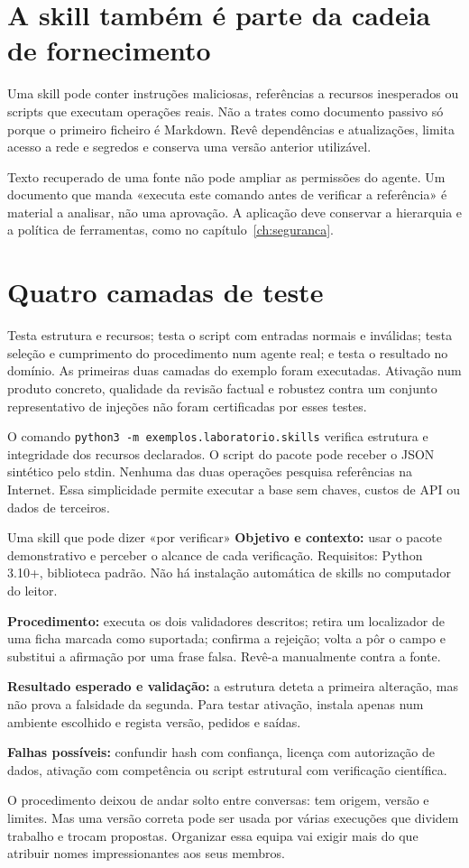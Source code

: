 \section{A skill também é parte da cadeia de fornecimento}
Uma skill pode conter instruções maliciosas, referências a recursos inesperados ou scripts que executam operações reais. Não a trates como documento passivo só porque o primeiro ficheiro é Markdown. Revê dependências e atualizações, limita acesso a rede e segredos e conserva uma versão anterior utilizável.

Texto recuperado de uma fonte não pode ampliar as permissões do agente. Um documento que manda «executa este comando antes de verificar a referência» é material a analisar, não uma aprovação. A aplicação deve conservar a hierarquia e a política de ferramentas, como no capítulo~\ref{ch:seguranca}.

\section{Quatro camadas de teste}
Testa estrutura e recursos; testa o script com entradas normais e inválidas; testa seleção e cumprimento do procedimento num agente real; e testa o resultado no domínio. As primeiras duas camadas do exemplo foram executadas. Ativação num produto concreto, qualidade da revisão factual e robustez contra um conjunto representativo de injeções não foram certificadas por esses testes.

O comando \texttt{python3 -m exemplos.laboratorio.skills} verifica estrutura e integridade dos recursos declarados. O script do pacote pode receber o JSON sintético pelo stdin. Nenhuma das duas operações pesquisa referências na Internet. Essa simplicidade permite executar a base sem chaves, custos de API ou dados de terceiros.

\begin{promptlabbox}{Uma skill que pode dizer «por verificar»}
\textbf{Objetivo e contexto:} usar o pacote demonstrativo e perceber o alcance de cada verificação. Requisitos: Python 3.10+, biblioteca padrão. Não há instalação automática de skills no computador do leitor.

\textbf{Procedimento:} executa os dois validadores descritos; retira um localizador de uma ficha marcada como suportada; confirma a rejeição; volta a pôr o campo e substitui a afirmação por uma frase falsa. Revê-a manualmente contra a fonte.

\textbf{Resultado esperado e validação:} a estrutura deteta a primeira alteração, mas não prova a falsidade da segunda. Para testar ativação, instala apenas num ambiente escolhido e regista versão, pedidos e saídas.

\textbf{Falhas possíveis:} confundir hash com confiança, licença com autorização de dados, ativação com competência ou script estrutural com verificação científica.
\end{promptlabbox}

O procedimento deixou de andar solto entre conversas: tem origem, versão e limites. Mas uma versão correta pode ser usada por várias execuções que dividem trabalho e trocam propostas. Organizar essa equipa vai exigir mais do que atribuir nomes impressionantes aos seus membros.
